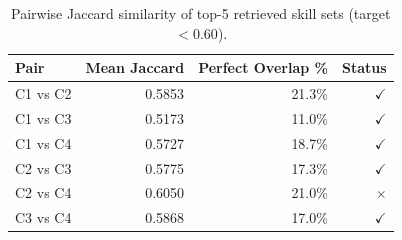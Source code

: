 \begin{table}[htbp]
\centering
\caption{Pairwise Jaccard similarity of top-5 retrieved skill sets (target $<0.60$).}
\label{tab:jaccard}
\begin{tabular}{lrrr}
\toprule
Pair & Mean Jaccard & Perfect Overlap \% & Status \\
\midrule
  C1 vs C2 & 0.5853 & 21.3\% & $\checkmark$ \\
  C1 vs C3 & 0.5173 & 11.0\% & $\checkmark$ \\
  C1 vs C4 & 0.5727 & 18.7\% & $\checkmark$ \\
  C2 vs C3 & 0.5775 & 17.3\% & $\checkmark$ \\
  C2 vs C4 & 0.6050 & 21.0\% & $\times$ \\
  C3 vs C4 & 0.5868 & 17.0\% & $\checkmark$ \\
\bottomrule
\end{tabular}
\end{table}